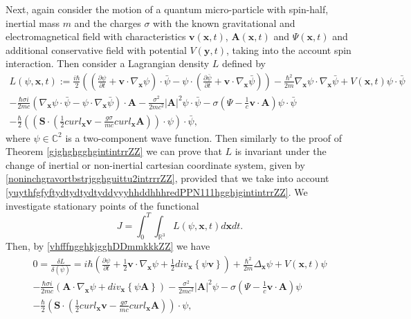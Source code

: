 \documentclass{article}
\theoremstyle{definition}
\theoremstyle{remark}
\renewcommand{\vec}[1]{\mathbf{#1}}
\newcommand{\er}{\eqref}
\newcommand{\er}{\eqref}
\begin{document}
Next, again consider the motion of a quantum micro-particle with
spin-half, inertial mass $m$ and the charges $\sigma$ with the known
gravitational and electromagnetical field with characteristics $\vec
v(\vec x,t)$, $\vec A(\vec x,t)$ and $\Psi(\vec x,t)$ and additional
conservative field with potential $V(\vec y,t)$, taking into the
account spin interaction. Then consider a Lagrangian density $L$
defined by
\begin{multline}\label{vhfffngghkjgghDDmmkkkZZ}
L\left(\psi,\vec x,t\right):=
\frac{i\hbar}{2}\left(\left(\frac{\partial\psi}{\partial t}+\vec
v\cdot\nabla_{\vec
x}\psi\right)\cdot\bar\psi-\psi\cdot\left(\frac{\partial\bar\psi}{\partial
t}+\vec v\cdot\nabla_{\vec
x}\bar\psi\right)\right)-\frac{\hbar^2}{2m}\nabla_{\vec
x}\psi\cdot\nabla_{\vec x}\bar\psi+V\left(\vec
x,t\right)\psi\cdot\bar\psi\\
-\frac{\hbar\sigma i}{2mc}\left(\nabla_{\vec
x}\psi\cdot\bar\psi-\psi\cdot\nabla_{\vec x}\bar\psi\right)\cdot\vec
A-\frac{\sigma^2}{2mc^2}\left|\vec A\right|^2\psi\cdot\bar\psi
-\sigma\left(\Psi-\frac{1}{c}\vec v\cdot\vec
A\right)\psi\cdot\bar\psi\\ -\frac{\hbar}{2}\left(\left(\vec
S\cdot\left(\frac{1}{2}curl_{\vec x}\vec
v-\frac{g\sigma}{mc}curl_{\vec x}\vec
A\right)\right)\cdot\psi\right)\cdot\bar\psi,
\end{multline}
where $\psi\in \mathbb{C}^2$ is a two-component wave function. Then
similarly to the proof of Theorem \ref{gjghghgghgintintrrZZ} we can
prove that $L$ is invariant under the change of inertial or
non-inertial cartesian coordinate system, given by
\er{noninchgravortbstrjgghguittu2intrrrZZ}, provided that we take
into account
\er{yuythfgfyftydtydtydtyddyyyhhddhhhredPPN111hgghjgintintrrZZ}. We
investigate stationary points of the functional
\begin{equation}\label{btfffygtgyggyDDmmkkkZZ}
J=\int_0^T\int_{\mathbb{R}^3}L\left(\psi,\vec x,t\right)d\vec x dt.
\end{equation}
Then, by \er{vhfffngghkjgghDDmmkkkZZ} we have
\begin{multline}\label{vhfffngghkjgghDDmmkkkghgZZ}
0=\frac{\delta L}{\delta (\bar\psi)}=
i\hbar\left(\frac{\partial\psi}{\partial t}+\frac{1}{2}\vec
v\cdot\nabla_{\vec x}\psi+\frac{1}{2}div_{\vec x}\left\{\psi\vec
v\right\}\right)+\frac{\hbar^2}{2m}\Delta_{\vec x}\psi+V\left(\vec
x,t\right)\psi\\
-\frac{\hbar\sigma i}{2mc}\left(\vec A\cdot\nabla_{\vec
x}\psi+div_{\vec x}\left\{\psi\vec
A\right\}\right)-\frac{\sigma^2}{2mc^2}\left|\vec A\right|^2\psi
-\sigma\left(\Psi-\frac{1}{c}\vec v\cdot\vec A\right)\psi
\\-\frac{\hbar}{2}\left(\vec S\cdot\left(\frac{1}{2}curl_{\vec x}\vec
v-\frac{g\sigma}{mc}curl_{\vec x}\vec A\right)\right)\cdot\psi,
\end{multline}
\end{document}
